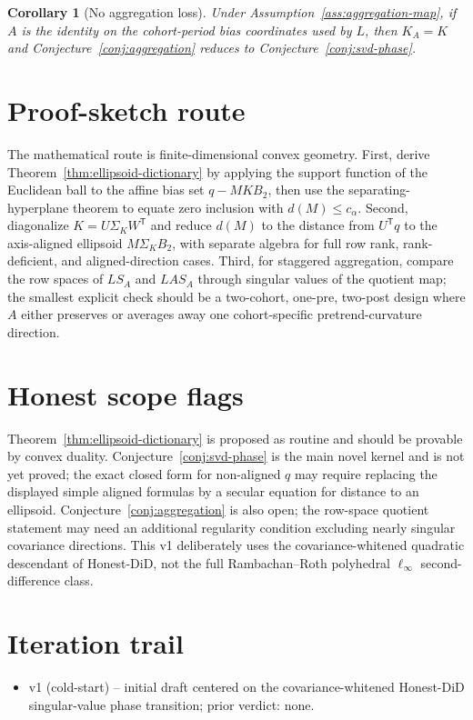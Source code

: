 \documentclass[11pt]{article}
\newcommand{\transpose}{\mathsf{T}}
\theoremstyle{definition}
\theoremstyle{plain}
\newtheorem{corollary}{Corollary}
\theoremstyle{remark}
\begin{document}
\begin{corollary}[No aggregation loss]\label{cor:no-aggregation-loss}
Under Assumption~\ref{ass:aggregation-map}, if \(A\) is the identity on the cohort-period bias coordinates used by \(L\), then \(K_A=K\) and Conjecture~\ref{conj:aggregation} reduces to Conjecture~\ref{conj:svd-phase}.
\end{corollary}

\section{Proof-sketch route}
The mathematical route is finite-dimensional convex geometry.
First, derive Theorem~\ref{thm:ellipsoid-dictionary} by applying the support function of the Euclidean ball to the affine bias set \(q-MK B_2\), then use the separating-hyperplane theorem to equate zero inclusion with \(d(M)\le c_\alpha\).
Second, diagonalize \(K=U\Sigma_K W^\transpose\) and reduce \(d(M)\) to the distance from \(U^\transpose q\) to the axis-aligned ellipsoid \(M\Sigma_K B_2\), with separate algebra for full row rank, rank-deficient, and aligned-direction cases.
Third, for staggered aggregation, compare the row spaces of \(L S_A\) and \(L A S_A\) through singular values of the quotient map; the smallest explicit check should be a two-cohort, one-pre, two-post design where \(A\) either preserves or averages away one cohort-specific pretrend-curvature direction.

\section{Honest scope flags}
Theorem~\ref{thm:ellipsoid-dictionary} is proposed as routine and should be provable by convex duality.
Conjecture~\ref{conj:svd-phase} is the main novel kernel and is not yet proved; the exact closed form for non-aligned \(q\) may require replacing the displayed simple aligned formulas by a secular equation for distance to an ellipsoid.
Conjecture~\ref{conj:aggregation} is also open; the row-space quotient statement may need an additional regularity condition excluding nearly singular covariance directions.
This v1 deliberately uses the covariance-whitened quadratic descendant of Honest-DiD, not the full Rambachan--Roth polyhedral \(\ell_\infty\) second-difference class.

\section{Iteration trail}
\begin{itemize}[leftmargin=*]
\item v1 (cold-start) -- initial draft centered on the covariance-whitened Honest-DiD singular-value phase transition; prior verdict: none.
\end{itemize}
\end{document}
